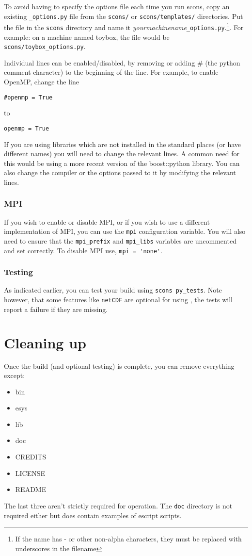 To avoid having to specify the options file each time you run scons, copy an existing \texttt{_options.py} file from the
\texttt{scons/} or \texttt{scons/templates/} directories. Put the file in the \texttt{scons} directory and name
it \textit{yourmachinename}\texttt{_options.py}.\footnote{If the name
has - or other non-alpha characters, they must be replaced with underscores in the filename}.
For example: on a machine named toybox, the file would be \texttt{scons/toybox_options.py}.

Individual lines can be enabled/disabled, by removing or adding \# (the python comment character) to the beginning of the line.
For example, to enable OpenMP, change the line
\begin{verbatim}
#openmp = True
\end{verbatim}
to
\begin{verbatim}
openmp = True
\end{verbatim}

If you are using libraries which are not installed in the standard places (or have different names) you will need to
change the relevant lines.
A common need for this would be using a more recent version of the boost::python library.
You can also change the compiler or the options passed to it by modifying the relevant lines.

\subsubsection*{MPI}
If you wish to enable or disable MPI, or if you wish to use a different implementation of MPI, you can use the \texttt{mpi}
configuration variable.
You will also need to ensure that the \texttt{mpi_prefix} and \texttt{mpi_libs} variables are uncommented and set correctly.
To disable MPI use, \verb|mpi = 'none'|.


\subsubsection{Testing}
As indicated earlier, you can test your build using \texttt{scons py_tests}.
Note however, that some features like \texttt{netCDF} are optional for using \escript, the tests will report a failure if
they are missing.

\section{Cleaning up}
\label{sec:cleanup}

Once the build (and optional testing) is complete, you can remove everything except:
\begin{itemize}
 \item bin
 \item esys
 \item lib
 \item doc
 \item CREDITS
 \item LICENSE
 \item README
\end{itemize}
The last three aren't strictly required for operation.
The \texttt{doc} directory is not required either but does contain examples of escript scripts.

